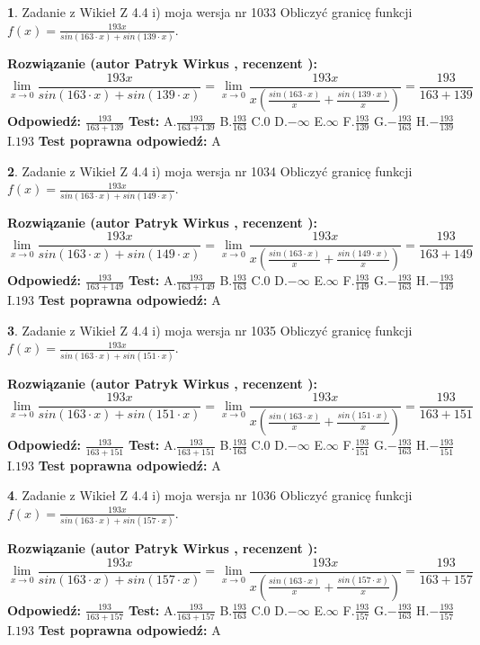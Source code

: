\documentclass[12pt, a4paper]{article}
\theoremstyle{definition} %
\newtheorem{zad}{}
\newcommand{\zadStart}[1]{\begin{zad}#1\newline}
\newcommand{\zadStop}{\end{zad}}
\newcommand{\rozwStart}[2]{\noindent \textbf{Rozwiązanie (autor #1 , recenzent #2): }\newline}
\newcommand{\rozwStop}{\newline}
\newcommand{\odpStart}{\noindent \textbf{Odpowiedź:}\newline}
\newcommand{\odpStop}{\newline}
\newcommand{\testStart}{\noindent \textbf{Test:}\newline}
\newcommand{\testStop}{\newline}
\newcommand{\kluczStart}{\noindent \textbf{Test poprawna odpowiedź:}\newline}
\newcommand{\kluczStop}{\newline}
\begin{document}
\zadStart{Zadanie z Wikieł Z 4.4 i) moja wersja nr 1033}
Obliczyć granicę funkcji $f(x)=\frac{193x}{sin(163\cdot x) +sin(139\cdot x)}$.
\zadStop
\rozwStart{Patryk Wirkus}{}
$$\lim\limits_{x\to 0}\frac{193x}{sin(163\cdot x) +sin(139\cdot x)}=\lim\limits_{x\to 0}\frac{193x}{x(\frac{sin(163\cdot x)}{x}+\frac{sin(139\cdot x)}{x})}=\frac{193}{163+139}$$
\rozwStop
\odpStart
$\frac{193}{163+139}$
\odpStop
\testStart
A.$\frac{193}{163+139}$
B.$\frac{193}{163}$
C.$0$
D.$-\infty$
E.$\infty$
F.$\frac{193}{139}$
G.$-\frac{193}{163}$
H.$-\frac{193}{139}$
I.$193$
\testStop
\kluczStart
A
\kluczStop



\zadStart{Zadanie z Wikieł Z 4.4 i) moja wersja nr 1034}
Obliczyć granicę funkcji $f(x)=\frac{193x}{sin(163\cdot x) +sin(149\cdot x)}$.
\zadStop
\rozwStart{Patryk Wirkus}{}
$$\lim\limits_{x\to 0}\frac{193x}{sin(163\cdot x) +sin(149\cdot x)}=\lim\limits_{x\to 0}\frac{193x}{x(\frac{sin(163\cdot x)}{x}+\frac{sin(149\cdot x)}{x})}=\frac{193}{163+149}$$
\rozwStop
\odpStart
$\frac{193}{163+149}$
\odpStop
\testStart
A.$\frac{193}{163+149}$
B.$\frac{193}{163}$
C.$0$
D.$-\infty$
E.$\infty$
F.$\frac{193}{149}$
G.$-\frac{193}{163}$
H.$-\frac{193}{149}$
I.$193$
\testStop
\kluczStart
A
\kluczStop



\zadStart{Zadanie z Wikieł Z 4.4 i) moja wersja nr 1035}
Obliczyć granicę funkcji $f(x)=\frac{193x}{sin(163\cdot x) +sin(151\cdot x)}$.
\zadStop
\rozwStart{Patryk Wirkus}{}
$$\lim\limits_{x\to 0}\frac{193x}{sin(163\cdot x) +sin(151\cdot x)}=\lim\limits_{x\to 0}\frac{193x}{x(\frac{sin(163\cdot x)}{x}+\frac{sin(151\cdot x)}{x})}=\frac{193}{163+151}$$
\rozwStop
\odpStart
$\frac{193}{163+151}$
\odpStop
\testStart
A.$\frac{193}{163+151}$
B.$\frac{193}{163}$
C.$0$
D.$-\infty$
E.$\infty$
F.$\frac{193}{151}$
G.$-\frac{193}{163}$
H.$-\frac{193}{151}$
I.$193$
\testStop
\kluczStart
A
\kluczStop



\zadStart{Zadanie z Wikieł Z 4.4 i) moja wersja nr 1036}
Obliczyć granicę funkcji $f(x)=\frac{193x}{sin(163\cdot x) +sin(157\cdot x)}$.
\zadStop
\rozwStart{Patryk Wirkus}{}
$$\lim\limits_{x\to 0}\frac{193x}{sin(163\cdot x) +sin(157\cdot x)}=\lim\limits_{x\to 0}\frac{193x}{x(\frac{sin(163\cdot x)}{x}+\frac{sin(157\cdot x)}{x})}=\frac{193}{163+157}$$
\rozwStop
\odpStart
$\frac{193}{163+157}$
\odpStop
\testStart
A.$\frac{193}{163+157}$
B.$\frac{193}{163}$
C.$0$
D.$-\infty$
E.$\infty$
F.$\frac{193}{157}$
G.$-\frac{193}{163}$
H.$-\frac{193}{157}$
I.$193$
\testStop
\kluczStart
A
\kluczStop
\end{document}
